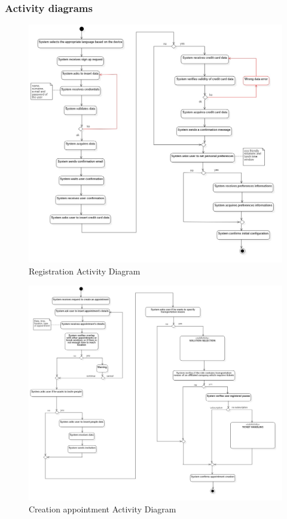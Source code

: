 	\subsubsection{Activity diagrams}
		\begin{figure}[H]
			\centerline{\includegraphics[width=\paperwidth-1]{Images/RegistrationDiagramAD}}
			\caption{Registration Activity Diagram}
		\end{figure}
		\begin{figure}[H]
			\centerline{\includegraphics[width=\paperwidth-1]{Images/CreationAppointmentAD}}
			\caption{Creation appointment Activity Diagram}
		\end{figure}
